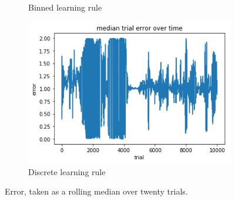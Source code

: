 \documentclass{article}
\theoremstyle{plain}
\theoremstyle{definition}
\theoremstyle{remark}
\begin{document}
\begin{figure}
\begin{subfigure}{.5\textwidth}
  \caption{Binned learning rule}
  \label{fig:sfig1}
\end{subfigure}%
\begin{subfigure}{.5\textwidth}
  \centering
  \includegraphics[width=.8\linewidth]{10k_discrete}
  \caption{Discrete learning rule}
  \label{fig:sfig2}
\end{subfigure}
\caption{Error, taken as a rolling median over twenty trials.}
\label{fig:fig}
\end{figure}
\end{document}
